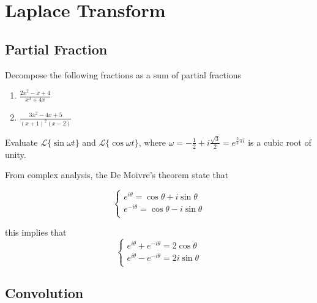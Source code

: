 \chapter{Laplace Transform}

\section{Partial Fraction}

\begin{example}
    Decompose the following fractions as a sum of partial fractions
    \begin{enumerate}
        \item $\displaystyle \frac{2x^2 - x + 4}{x^3 + 4x}$
        \item $\displaystyle \frac{3x^2 -4x + 5}{(x+1)^2(x-2)}$
    \end{enumerate}
\end{example}

\begin{example}
    Evaluate $\mathcal{L}\{\sin \omega t \}$ and $\mathcal{L}\{\cos \omega t \}$, where 
    $\omega = -\frac{1}{2}+i\frac{\sqrt{3}}{2} = e^{\frac{2}{3}\pi i}$ is a cubic root of unity.
\end{example}
\begin{solution}
    From complex analysis, the De Moivre's theorem state that 

    \[
        \begin{cases}
            e^{i\theta} = \cos \theta + i \sin \theta\\
            e^{-i\theta} = \cos \theta - i \sin \theta\\
        \end{cases}
    \]

    this implies that 
    \[
    \begin{cases}
        e^{i\theta} + e^{-i\theta} = 2\cos \theta\\
        e^{i\theta} - e^{-i\theta} = 2i \sin \theta\\
    \end{cases}
    \]
\end{solution}

\section{Convolution}

